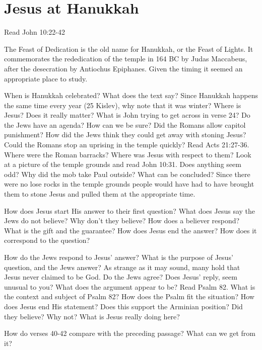 \chapter{Jesus at Hanukkah}

Read John 10:22-42

The Feast of Dedication is the old name for Hanukkah, or the Feast of Lights.  It commemorates the rededication of the temple in 164 BC by Judas Maccabeus, after the desecration by Antiochus Epiphanes.  Given the timing it seemed an appropriate place to study.

When is Hanukkah celebrated?  What does the text say?  Since Hanukkah happens the same time every year (25 Kislev), why note that it was winter?  Where is Jesus?  Does it really matter?  What is John trying to get across in verse 24?  Do the Jews have an agenda?  How can we be sure?  Did the Romans allow capitol punishment?  How did the Jews think they could get away with stoning Jesus?  Could the Romans stop an uprising in the temple quickly?  Read Acts 21:27-36.  Where were the Roman barracks? Where was Jesus with respect to them?  Look at a picture of the temple grounds and read John 10:31.  Does anything seem odd?  Why did the mob take Paul outside?  What can be concluded?  Since there were no lose rocks in the temple grounds people would have had to have brought them to stone Jesus and pulled them at the appropriate time.

How does Jesus start His answer to their first question?  What does Jesus say the Jews do not believe?  Why don't they believe?  How does a believer respond?  What is the gift and the guarantee?  How does Jesus end the answer?  How does it correspond to the question?

How do the Jews respond to Jesus' answer?  What is the purpose of Jesus' question, and the Jews answer?  As strange as it may sound, many hold that Jesus never claimed to be God.  Do the Jews agree?  Does Jesus' reply, seem unusual to you?  What does the argument appear to be?  Read Psalm 82.  What is the context and subject of Psalm 82?  How does the Psalm fit the situation?    How does Jesus end His statement?  Does this support the Arminian position?  Did they believe?  Why not?  What is Jesus really doing here?

How do verses 40-42 compare with the preceding passage?  What can we get from it?
